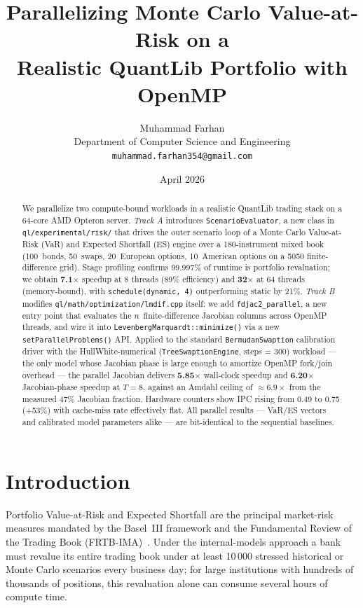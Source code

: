 \documentclass[11pt,twocolumn]{article}
\title{\textbf{Parallelizing Monte Carlo Value-at-Risk on a\\
       Realistic QuantLib Portfolio with OpenMP}}
\author{Muhammad Farhan\\
        \small Department of Computer Science and Engineering\\
        \small \texttt{muhammad.farhan354@gmail.com}}
\date{April 2026}
\begin{document}
\maketitle

\begin{abstract}
We parallelize two compute-bound workloads in a realistic QuantLib
trading stack on a 64-core AMD Opteron server.
\emph{Track A} introduces \texttt{ScenarioEvaluator}, a new class in
\texttt{ql/experimental/risk/} that drives the outer scenario loop of
a Monte Carlo Value-at-Risk (VaR) and Expected Shortfall (ES) engine
over a 180-instrument mixed book (100~bonds, 50~swaps, 20~European
options, 10~American options on a 50{\texttimes}50 finite-difference
grid).  Stage profiling confirms 99.997\% of runtime is portfolio
revaluation; we obtain \textbf{7.1$\times$} speedup at 8 threads
(89\% efficiency) and \textbf{32$\times$} at 64 threads (memory-bound),
with \texttt{schedule(dynamic, 4)} outperforming static by 21\%.
\emph{Track B} modifies \texttt{ql/math/optimization/lmdif.cpp} itself:
we add \texttt{fdjac2\_parallel}, a new entry point that evaluates the
$n$~finite-difference Jacobian columns across OpenMP threads, and wire
it into \texttt{LevenbergMarquardt::minimize()} via a new
\texttt{setParallelProblems()} API.  Applied to the standard
\texttt{BermudanSwaption} calibration driver with the HullWhite-numerical
(\texttt{TreeSwaptionEngine}, steps = 300) workload --- the only model
whose Jacobian phase is large enough to amortize OpenMP fork/join
overhead --- the parallel Jacobian delivers \textbf{5.85$\times$}
wall-clock speedup and \textbf{6.20$\times$} Jacobian-phase speedup at
$T = 8$, against an Amdahl ceiling of $\approx 6.9\times$ from the
measured 47\% Jacobian fraction.  Hardware counters show IPC rising
from 0.49 to 0.75 (+53\%) with cache-miss rate effectively flat.  All
parallel results --- VaR/ES vectors and calibrated model parameters
alike --- are bit-identical to the sequential baselines.
\end{abstract}

\section{Introduction}

Portfolio Value-at-Risk and Expected Shortfall are the principal
market-risk measures mandated by the Basel~III framework and the
Fundamental Review of the Trading Book (FRTB-IMA)~\cite{bcbs2019}.
Under the internal-models approach a bank must revalue its entire
trading book under at least 10\,000 stressed historical or Monte Carlo
scenarios every business day; for large institutions with hundreds of
thousands of positions, this revaluation alone can consume several
hours of compute time.
\end{document}
